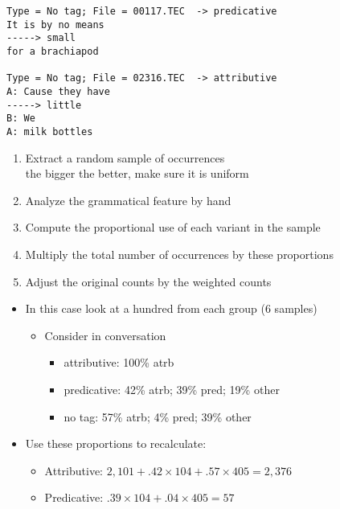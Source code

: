 \documentclass[a4paper,landscape,headrule,footrule,dvips]{foils}
\begin{document}
\begin{CJK}{UTF8}{min}
\begin{verbatim}
Type = No tag; File = 00117.TEC  -> predicative
It is by no means
-----> small
for a brachiapod

Type = No tag; File = 02316.TEC  -> attributive
A: Cause they have 
-----> little
B: We
A: milk bottles
\end{verbatim}



\MyLogo{}
\begin{enumerate}
\item Extract a random sample of occurrences
  \\ the bigger the better, make sure it is uniform
\item Analyze the grammatical feature by hand
\item Compute the proportional use of each variant in the sample
\item Multiply the total number of occurrences by these proportions
\item Adjust the original counts by the weighted counts
\end{enumerate}


\begin{itemize}
\item In this case look at a hundred from each group (6 samples)
  \begin{itemize}
  \item Consider  in conversation
    \begin{itemize}
    \item attributive: 100\% atrb
    \item predicative:   42\% atrb; 39\% pred; 19\% other
    \item no tag: 57\% atrb; 4\% pred; 39\% other
    \end{itemize}
  \end{itemize}
\item Use these proportions to recalculate:
  \begin{itemize}
  \item Attributive: $2,101 + .42\times 104 + .57 \times 405 = 2,376$
  \item Predicative: $.39\times 104 + .04 \times 405 = 57$
  \end{itemize}
\end{itemize}



\end{CJK}
\end{document}
